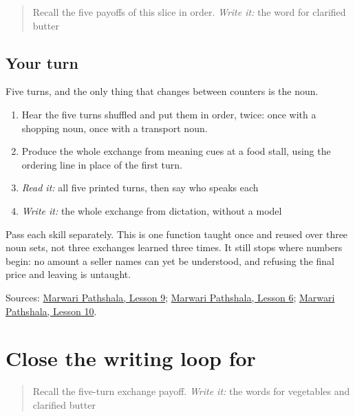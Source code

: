 \label{lesson:MW-C26-counter-exchange}



\begin{quote}
Recall the five payoffs of this slice in order. \emph{Write it:} the word for clarified butter
\end{quote}

\subsection*{Your turn}
Five turns, and the only thing that changes between counters is the noun.

\begin{enumerate}
\raggedright
  \item Hear the five turns shuffled and put them in order, twice: once with a shopping noun, once with a transport noun.
  \item Produce the whole exchange from meaning cues at a food stall, using the ordering line in place of the first turn.
  \item \emph{Read it:} all five printed turns, then say who speaks each
  \item \emph{Write it:} the whole exchange from dictation, without a model
\end{enumerate}

Pass each skill separately. This is one function taught once and reused over three noun sets, not three exchanges learned three times. It still stops where numbers begin: no amount a seller names can yet be understood, and refusing the final price and leaving is untaught.

\begin{tcolorbox}[breakable,colback=teal!4,colframe=teal!35!black,title={Before you move on}]
Sources: \href{https://www.marwaripathshala.com/marwari-lesson-9-english}{Marwari Pathshala, Lesson 9}; \href{https://www.marwaripathshala.com/marwari-lesson-6-english}{Marwari Pathshala, Lesson 6}; \href{https://www.marwaripathshala.com/marwari-lesson-10-english}{Marwari Pathshala, Lesson 10}.
\end{tcolorbox}
\section[Practice]{Close the writing loop for }

\label{lesson:MW-R26-script-close}



\begin{quote}
Recall the five-turn exchange payoff. \emph{Write it:} the words for vegetables and clarified butter
\end{quote}


